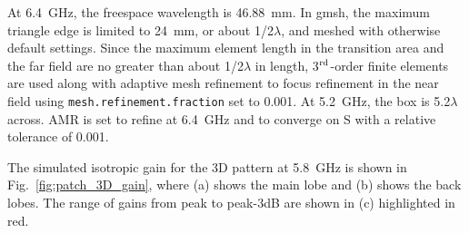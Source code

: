 \documentclass[titlepage]{article}
\renewcommand\_{\textunderscore\linebreak[1]}
\begin{document}
At 6.4~GHz, the freespace wavelength is 46.88~mm.  In gmsh, the maximum triangle edge is limited to 24~mm, or about 1/2$\lambda$, and meshed with otherwise default settings.  Since the maximum element length in the transition area and the far field are no greater than about 1/2$\lambda$ in length, 3$^{\textnormal{rd}}$-order finite elements are used along with adaptive mesh refinement to focus refinement in the near field using \texttt{mesh.refinement.fraction} set to 0.001.  At 5.2~GHz, the box is 5.2$\lambda$ across.  AMR is set to refine at 6.4~GHz and to converge on S with a relative tolerance of 0.001.

The simulated isotropic gain for the 3D pattern at 5.8~GHz is shown in Fig.~\ref{fig:patch_3D_gain}, where (a) shows the main lobe and (b) shows the back lobes.  The range of gains from peak to peak-3dB are shown in (c) highlighted in red.
\end{document}

